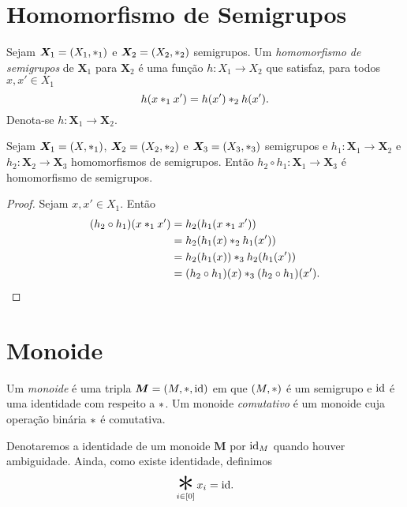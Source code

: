 \section{Homomorfismo de Semigrupos}

\begin{defi}
Sejam $\bm X_1=(X_1,\ast_1)$ e $\bm X_2=(X_2,\ast_2)$ semigrupos. Um \emph{homomorfismo de semigrupos} de $\bm X_1$ para $\bm X_2$ é uma função $h: X_1 \to X_2$ que satisfaz, para todos $x,x' \in X_1$
	\begin{equation*}
	h(x  \ast_1  x')=h(x') \ast_2 h(x').
	\end{equation*}
\noindent Denota-se $h: \bm X_1 \to \bm X_2$. %
\end{defi}

\begin{prop}
\label{comp.hom.sem}
Sejam $\bm X_1=(X,\ast_1)$, $\bm X_2=(X_2,\ast_2)$ e $\bm X_3=(X_3,\ast_3)$ semigrupos e $h_1: \bm X_1 \to \bm X_2$ e $h_2: \bm X_2 \to \bm X_3$ homomorfismos de semigrupos. Então $h_2 \circ h_1: \bm X_1 \to \bm X_3$ é homomorfismo de semigrupos.
\end{prop}
\begin{proof}
Sejam $x,x' \in X_1$. Então
	\begin{align*}
	(h_2 \circ h_1)(x \ast_1 x') &= h_2(h_1(x \ast_1 x')) \\
		&= h_2(h_1(x) \ast_2 h_1(x')) \\
		&= h_2(h_1 (x)) \ast_3 h_2(h_1(x')) \\
		&= (h_2 \circ h_1)(x) \ast_3 (h_2 \circ h_1)(x').
	\end{align*}
\end{proof}

\section{Monoide}

\begin{defi}
Um \emph{monoide} é uma tripla $\bm M=(M,\ast,\mathrm{id})$ em que $(M,\ast)$ é um semigrupo e $\mathrm{id}$ é uma identidade com respeito a $\ast$. Um monoide \emph{comutativo} é um monoide cuja operação binária $\ast$ é comutativa.
\end{defi}

\begin{nota}
Denotaremos a identidade de um monoide $\bm M$ por $\mathrm{id}_M$ quando houver ambiguidade. Ainda, como existe identidade, definimos
	\begin{equation*}
	\bigopb_{i \in [0]} x_i = \id.
	\end{equation*}
\end{nota}

